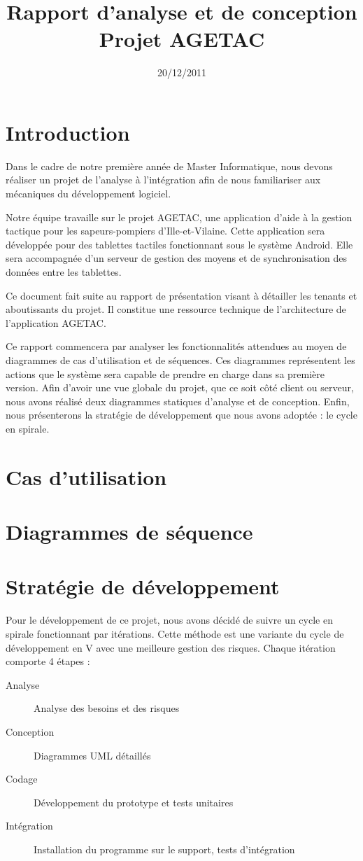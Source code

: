 \documentclass{article}
\title{Rapport d'analyse et de conception\\Projet AGETAC}
\date{20/12/2011}
\begin{document}
\maketitle

\tableofcontents 


\section*{Introduction}

Dans le cadre de notre première année de Master Informatique, nous devons réaliser un projet de l’analyse à l’intégration afin de nous familiariser aux mécaniques du développement logiciel.

Notre équipe travaille sur le projet AGETAC, une application d’aide à la gestion tactique pour les sapeurs-pompiers d’Ille-et-Vilaine. Cette application sera développée pour des tablettes tactiles fonctionnant sous le système Android. Elle sera accompagnée d’un serveur de gestion des moyens et de synchronisation des données entre les tablettes.

Ce document fait suite au rapport de présentation visant à détailler les tenants et aboutissants du projet. Il constitue une ressource technique de l’architecture de l’application AGETAC.

Ce rapport commencera par analyser les fonctionnalités attendues au moyen de diagrammes de cas d’utilisation et de séquences. Ces diagrammes représentent les actions que le système sera capable de prendre en charge dans sa première version. Afin d’avoir une vue globale du projet, que ce soit côté client ou serveur, nous avons réalisé deux diagrammes statiques d’analyse et de conception. Enfin, nous présenterons la stratégie de développement que nous avons adoptée : le cycle en spirale.


\section{Cas d'utilisation}

\section{Diagrammes de séquence}

\section{Stratégie de développement}

Pour le développement de ce projet, nous avons décidé de suivre un cycle en spirale fonctionnant par itérations. Cette méthode est une variante du cycle de développement en V avec une meilleure gestion des risques. Chaque itération comporte 4 étapes :
\begin{description}
 \item[Analyse] Analyse des besoins et des risques
 \item[Conception] Diagrammes UML détaillés
 \item[Codage] Développement du prototype et tests unitaires
 \item[Intégration] Installation du programme sur le support, tests d’intégration
\end{description}
\end{document}
